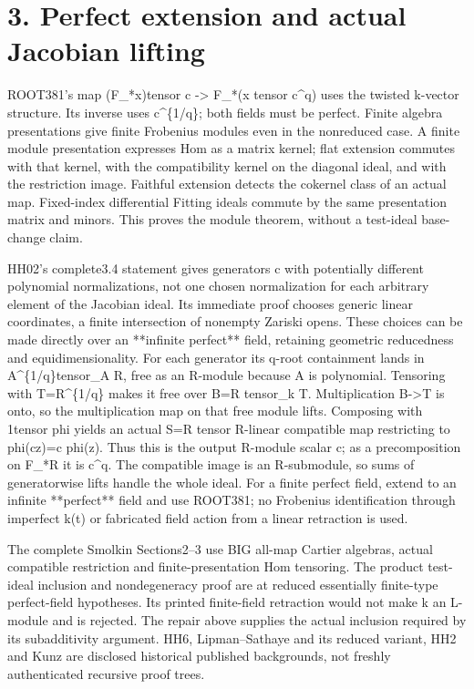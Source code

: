 \documentclass[11pt]{article}
\begin{document}
\section{3. Perfect extension and actual Jacobian lifting}

ROOT381's map (F\_*x)tensor c -> F\_*(x tensor c\textasciicircum{}q) uses the twisted k-vector structure. Its inverse uses c\textasciicircum{}\{1/q\}; both fields must be perfect. Finite algebra presentations give finite Frobenius modules even in the nonreduced case. A finite module presentation expresses Hom as a matrix kernel; flat extension commutes with that kernel, with the compatibility kernel on the diagonal ideal, and with the restriction image. Faithful extension detects the cokernel class of an actual map. Fixed-index differential Fitting ideals commute by the same presentation matrix and minors. This proves the module theorem, without a test-ideal base-change claim.

HH02's complete3.4 statement gives generators c with potentially different polynomial normalizations, not one chosen normalization for each arbitrary element of the Jacobian ideal. Its immediate proof chooses generic linear coordinates, a finite intersection of nonempty Zariski opens. These choices can be made directly over an **infinite perfect** field, retaining geometric reducedness and equidimensionality. For each generator its q-root containment lands in A\textasciicircum{}\{1/q\}tensor\_A R, free as an R-module because A is polynomial. Tensoring with T=R\textasciicircum{}\{1/q\} makes it free over B=R tensor\_k T. Multiplication B->T is onto, so the multiplication map on that free module lifts. Composing with 1tensor phi yields an actual S=R tensor R-linear compatible map restricting to phi(cz)=c phi(z). Thus this is the output R-module scalar c; as a precomposition on F\_*R it is c\textasciicircum{}q. The compatible image is an R-submodule, so sums of generatorwise lifts handle the whole ideal. For a finite perfect field, extend to an infinite **perfect** field and use ROOT381; no Frobenius identification through imperfect k(t) or fabricated field action from a linear retraction is used.

The complete Smolkin Sections2--3 use BIG all-map Cartier algebras, actual compatible restriction and finite-presentation Hom tensoring. The product test-ideal inclusion and nondegeneracy proof are at reduced essentially finite-type perfect-field hypotheses. Its printed finite-field retraction would not make k an L-module and is rejected. The repair above supplies the actual inclusion required by its subadditivity argument. HH6, Lipman--Sathaye and its reduced variant, HH2 and Kunz are disclosed historical published backgrounds, not freshly authenticated recursive proof trees.
\end{document}
